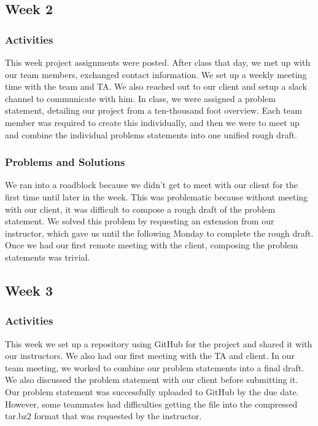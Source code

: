 \documentclass[onecolumn, draftclsnofoot,10pt, compsoc]{IEEEtran}
\begin{document}
\subsection{Week 2}

\subsubsection{Activities}
This week project assignments were posted. After class that day, we met up with our team members, exchanged contact information. We set up a weekly meeting time with the team and TA. We also reached out to our client and setup a slack channel to communicate with him. In class, we were assigned a problem statement, detailing our project from a ten-thousand foot overview. Each team member was required to create this individually, and then we were to meet up and combine the individual problems statements into one unified rough draft.

\subsubsection{Problems and Solutions}
We ran into a roadblock because we didn’t get to meet with our client for the first time until later in the week. This was problematic because without meeting with our client, it was difficult to compose a rough draft of the problem statement. We solved this problem by requesting an extension from our instructor, which gave us until the following Monday to complete the rough draft. Once we had our first remote meeting with the client, composing the problem statements was trivial.

\subsection{Week 3}

\subsubsection{Activities}
This week we set up a repository using GitHub for the project and shared it with our instructors. We also had our first meeting with the TA and client. In our team meeting, we worked to combine our problem statements into a final draft. We also discussed the problem statement with our client before submitting it. Our problem statement was successfully uploaded to GitHub by the due date. However, some teammates had difficulties getting the file into the compressed tar.bz2 format that was requested by the instructor.
\end{document}
